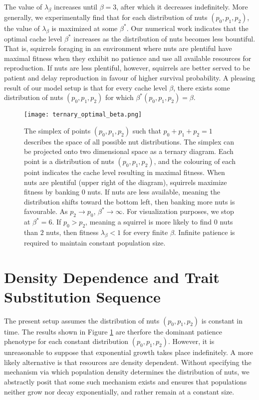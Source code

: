 \documentclass[titlepage, hidelinks, 12pt]{article}
\theoremstyle{plain}
\theoremstyle{remark}
\theoremstyle{definition}
\begin{document}
The value of $\lambda_\beta$ increases until $\beta = 3$, after which it decreases indefinitely. More generally, we experimentally find that
for each distribution of nuts $(p_0, p_1, p_2)$, the value of $\lambda_\beta$ is maximized at some $\beta^*$. 
Our numerical work indicates that the optimal cache level $\beta^*$ increases as the distribution of nuts becomes less bountiful.
That is, squirrels foraging in an environment where nuts are plentiful have maximal fitness when they exhibit no patience and use all available
resources for reproduction. If nuts are less plentiful, however, squirrels are better served to be patient and delay reproduction in favour of
higher survival probability. A pleasing result of our model setup is that for every cache level $\beta$, there exists some distribution of nuts
$(p_0, p_1, p_2)$ for which $\beta^*(p_0, p_1, p_2) = \beta$.

\begin{figure}[H]
    \centering
    \texttt{[image: ternary\_optimal\_beta.png]}
    \caption[Ternary plot showing $\lambda$ maximizing patience for each nut distribution $(p_0, p_1, p_1)$.]{The simplex of points $(p_0, p_1, p_2)$ such that $p_0 + p_1 + p_2 =1$ describes the space of all possible nut distributions.
        The simplex can be projected onto two dimensional space as a ternary diagram. Each point is a distribution of nuts $(p_0, p_1, p_2)$,
        and 
    the colouring of each point indicates the cache level resulting in maximal fitness. When nuts are plentiful (upper right of the diagram),
squirrels maximize fitness by banking $0$ nuts. If nuts are less available, meaning the distribution shifts toward the bottom left, 
then banking more nuts is favourable. As $p_2\to p_0$, $\beta^*\to\infty$. For visualization purposes, we stop at $\beta^* = 6$. 
If $p_0 > p_2$, meaning a squirrel is more likely to find $0$ nuts than $2$ nuts, then fitness $\lambda_\beta < 1$
for every finite $\beta$. Infinite patience is required to maintain constant population size.}
    \label{fig:optimal_beta}
\end{figure}






\section{Density Dependence and Trait Substitution Sequence}
The present setup assumes the distribution of nuts $(p_0, p_1, p_2)$ is constant in time. The results shown in Figure \ref{fig:optimal_beta}
are therfore the dominant patience phenotype for each constant distribution $(p_0, p_1, p_2).$ However, it is unreasonable to suppose that
exponential growth takes place indefinitely. 
A more likely alternative is that resources
are density dependent. Without specifying the mechanism via which population density determines the distribution of nuts, we abstractly
posit that some such mechanism exists and ensures that populations neither grow nor decay exponentially, and rather remain at a constant size.
\end{document}
